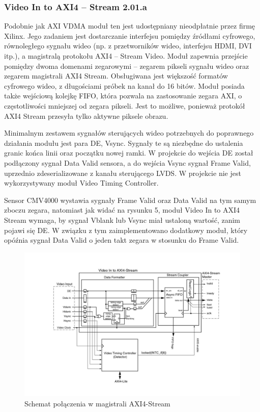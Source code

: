 \documentclass[a4paper,11pt,oneside]{book}  %
\begin{document}
\subsubsection{Video In to AXI4 – Stream 2.01.a} 

Podobnie jak AXI VDMA moduł ten jest udostępniany nieodpłatnie przez firmę Xilinx. Jego zadaniem jest dostarczanie interfejsu pomiędzy źródłami cyfrowego, równoległego sygnału wideo (np. z przetworników wideo, interfejsu HDMI, DVI itp.), a magistralą protokołu AXI4 – Stream Video. Moduł zapewnia przejście pomiędzy dwoma domenami zegarowymi – zegarem pikseli sygnału wideo oraz zegarem magistrali AXI4 Stream. Obsługiwana jest większość formatów cyfrowego wideo, z długościami próbek na kanał do 16 bitów. Moduł posiada także wejściową kolejkę FIFO, która pozwala na zastosowanie zegara AXI, o częstotliwości mniejszej od zegara pikseli. Jest to możliwe, ponieważ protokół AXI4 Stream przesyła tylko aktywne piksele obrazu. 

Minimalnym zestawem sygnałów sterujących wideo potrzebnych do poprawnego działania modułu jest para DE, Vsync. Sygnały te są niezbędne do ustalenia granic końca linii oraz początku nowej ramki. W projekcie do wejścia DE został podłączony sygnał Data Valid sensora, a do wejścia Vsync sygnał Frame Valid, uprzednio zdeserializowane z kanału sterującego LVDS. W projekcie nie jest wykorzystywany moduł Video Timing Controller. 

Sensor CMV4000 wystawia sygnały Frame Valid oraz Data Valid na tym samym zboczu zegara, natomiast jak widać na rysunku 5, moduł Video In to AXI4 Stream wymaga, by sygnał Vblank lub Vsync miał ustaloną wartość, zanim pojawi się DE. W związku z tym zaimplementowano dodatkowy moduł, który opóźnia sygnał Data Valid o jeden takt zegara w stosunku do Frame Valid.

\begin{figure}[H]
	\centering
	\includegraphics[width=14cm]{data4.png}
	\caption{Schemat połączenia w magistrali AXI4-Stream}
	\label{fig:Zynq3}
\end{figure}
\end{document}
